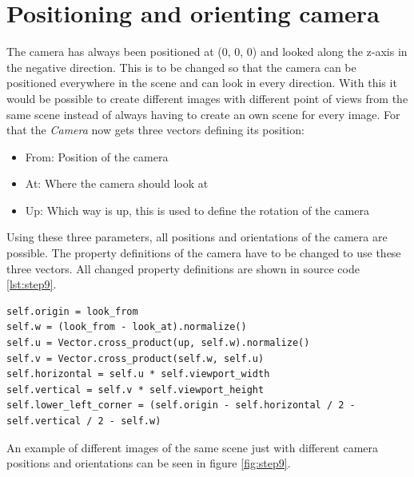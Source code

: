 \documentclass[12pt]{report}
\begin{document}
\chapter{Positioning and orienting camera}
The camera has always been positioned at (0, 0, 0) and looked along the z-axis in the negative direction. This is to be changed so that the camera can be positioned everywhere in the scene and can look in every direction. With this it would be possible to create different images with different point of views from the same scene instead of always having to create an own scene for every image. For that the \textit{Camera} now gets three vectors defining its position:
\begin{itemize}
\item From: Position of the camera
\item At: Where the camera should look at
\item Up: Which way is up, this is used to define the rotation of the camera
\end{itemize}
Using these three parameters, all positions and orientations of the camera are possible. The property definitions of the camera have to be changed to use these three vectors. All changed property definitions are shown in source code \ref{lst:step9}.
\begin{lstlisting}[caption={Updated camera properties}, label=lst:step9, style=mystyle]
self.origin = look_from
self.w = (look_from - look_at).normalize()
self.u = Vector.cross_product(up, self.w).normalize()
self.v = Vector.cross_product(self.w, self.u)
self.horizontal = self.u * self.viewport_width
self.vertical = self.v * self.viewport_height
self.lower_left_corner = (self.origin - self.horizontal / 2 - self.vertical / 2 - self.w)
\end{lstlisting}
An example of different images of the same scene just with different camera positions and orientations can be seen in figure \ref{fig:step9}.
\end{document}
